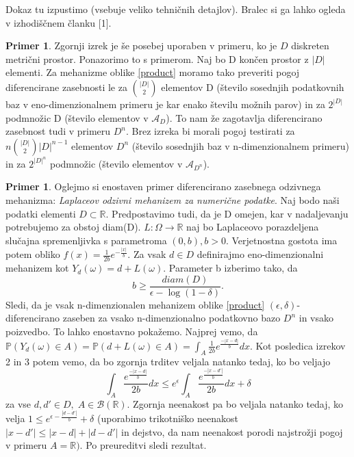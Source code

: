 \documentclass[12pt,a4paper]{amsart}
\theoremstyle{definition} %
\newtheorem{primer}[definicija]{Primer}
\theoremstyle{plain} %
\begin{document}
Dokaz tu izpustimo (vsebuje veliko tehničnih detajlov). Bralec si ga lahko ogleda v izhodiščnem članku [1].
\newline
\newline
\begin{primer} Zgornji izrek je še posebej uporaben v primeru, ko je $D$ diskreten metrični prostor. Ponazorimo to s primerom. Naj bo D končen prostor z $|D|$ elementi. Za mehanizme oblike \eqref{product} moramo tako preveriti pogoj diferencirane zasebnosti le za $\binom{|D|}{2}$ elementov D (število sosednjih podatkovnih baz v eno-dimenzionalnem primeru je kar enako številu možnih parov) in za $2^{|D|}$ podmnožic D (število elementov v $\mathcal{A}_D$). To nam že zagotavlja diferencirano zasebnost tudi v primeru $D^n$.  Brez izreka bi morali pogoj testirati za $n\binom{|D|}{2}|D|^{n-1}$ elementov $D^n$ (število sosednjih baz v n-dimenzionalnem primeru) in za $2^{|D|^n}$ podmnožic (število elementov v $\mathcal{A}_{D^n}$).
\end{primer}
\begin{primer}  Oglejmo si enostaven primer diferencirano zasebnega odzivnega mehanizma: \textit{Laplaceov odzivni mehanizem za numerične podatke}. Naj bodo naši podatki elementi $D \subset \mathbb{R}$. Predpostavimo tudi, da je D omejen, kar v nadaljevanju potrebujemo za obstoj diam(D). $L: \Omega \rightarrow \mathbb{R}$ naj bo Laplaceovo porazdeljena slučajna spremenljivka s parametroma $(0,b), b > 0$.  
Verjetnostna gostota ima potem obliko $f(x)=\frac{1}{2b}e^{-\frac{|x|}{b}}$.  Za vsak $d \in D$ definirajmo eno-dimenzionalni mehanizem kot  $Y_{d}(\omega) = d + L(\omega)$. Parameter b izberimo tako, da 
$$b\geq \frac{diam(D)}{\epsilon - \log(1-\delta)}.$$
Sledi, da je vsak n-dimenzionalen mehanizem oblike \eqref{product} $(\epsilon, \delta)$-diferencirano zaseben za vsako n-dimenzionalno podatkovno bazo $D^n$ in vsako poizvedbo. To lahko enostavno pokažemo. 
\newline
\newline
Najprej vemo, da $\mathbb{P}(Y_{d}(\omega) \in A) = \mathbb{P}(d + L(\omega) \in A) = \int_{A}\frac{1}{2b}e^{\frac{-|x-d|}{b}}dx$. Kot posledica izrekov 2 in 3 potem vemo, da bo zgornja trditev veljala natanko tedaj, ko bo veljajo 
$$\int_{A}\frac{e^{\frac{-|x-d|}{b}}}{2b}dx \leq e^{\epsilon}\int_{A}\frac{e^{\frac{-|x-d'|}{b}}}{2b}dx + \delta$$
za vse $d,d' \in D, \; A \in \mathcal{B}(\mathbb{R})$. Zgornja neenakost pa bo veljala natanko tedaj, ko velja $1 \leq e^{\epsilon - \frac{|d-d'|}{b}} + \delta$ (uporabimo trikotniško neenakost $|x-d'| \leq |x-d| + |d -d'|$ in dejstvo, da nam neenakost porodi najstrožji pogoj v primeru $A=\mathbb{R})$. Po preureditvi sledi rezultat. 
\end{primer}
\end{document}
